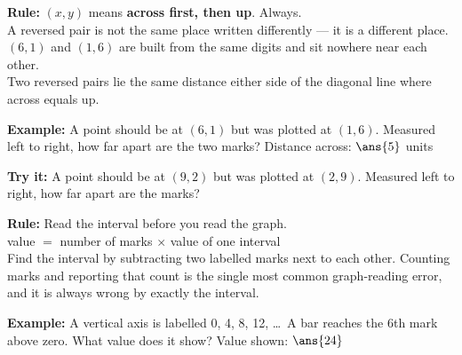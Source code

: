 \documentclass[12pt]{article}
\begin{document}


\begin{formulabox}
\textbf{Rule:} $(x, y)$ means \textbf{across first, then up}. Always.\\[3pt]
A reversed pair is not the same place written differently --- it is a different place. $(6, 1)$ and $(1, 6)$ are built from the same digits and sit nowhere near each other.\\[3pt]
Two reversed pairs lie the same distance either side of the diagonal line where across equals up.
\end{formulabox}

\begin{examplebox}
\textbf{Example:} \quad A point should be at $(6, 1)$ but was plotted at $(1, 6)$. Measured left to right, how far apart are the two marks?
Distance across: $\ans{5}$ units
\end{examplebox}

\begin{tryitbox}
\textbf{Try it:} \quad A point should be at $(9, 2)$ but was plotted at $(2, 9)$. Measured left to right, how far apart are the marks?\\[2pt]
\end{tryitbox}


\begin{formulabox}
\textbf{Rule:} Read the interval before you read the graph.\\[3pt]
value $=$ number of marks $\times$ value of one interval\\[3pt]
Find the interval by subtracting two labelled marks next to each other. Counting marks and reporting that count is the single most common graph-reading error, and it is always wrong by exactly the interval.
\end{formulabox}

\begin{examplebox}
\textbf{Example:} \quad A vertical axis is labelled 0, 4, 8, 12, \ldots\ A bar reaches the 6th mark above zero. What value does it show?
Value shown: $\ans{24}$
\end{examplebox}
\end{document}
